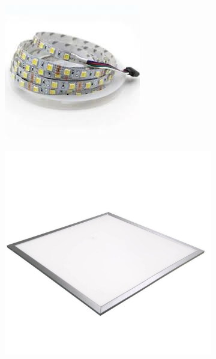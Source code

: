 \documentclass[fleqn,twoside]{article}
\begin{document}
\begin{figure}[h]
	\centering
	\begin{subfigure}{.5\textwidth}
		\centering
		\includegraphics[width=.7\linewidth]{strip_LED.jpg}
		\caption{}
		\label{fig:strip_LED}
	\end{subfigure}%
	\begin{subfigure}{.5\textwidth}
		\centering
		\includegraphics[width=0.7\linewidth]{panel_LED.jpg}
		\caption{}
		\label{fig:panel_LED}
	\end{subfigure}%


\end{figure}
\end{document}
